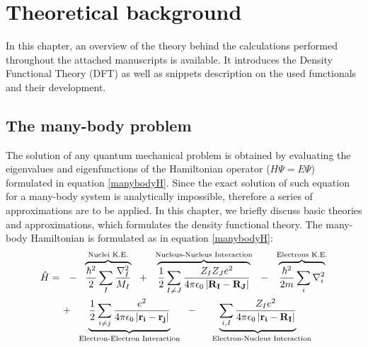 \chapter{Theoretical background}
\label{DFT-chapter}
In this chapter, an overview of the theory behind the calculations performed throughout the attached manuscripts is available. It introduces the Density Functional Theory (DFT) as well as snippets description on the used functionals and their development.
\section{The many-body problem}
The solution of any quantum mechanical problem is obtained by evaluating the eigenvalues and eigenfunctions of the Hamiltonian operator ($H\Psi=E\Psi$) formulated in equation \ref{manybodyH}. Since the exact solution of such equation for a many-body system is analytically impossible, therefore a series of approximations are to be applied. In this chapter, we briefly discuss basic theories and approximations, which formulates the density functional theory. The many-body Hamiltonian is formulated as in equation \ref{manybodyH}:
\begin{multline}
\hat{H}=\,\,\,\,-\,\,\,\,\overbrace{\frac{\hbar^2}{2}\sum_{I}{\frac{\nabla_I^2}{M_I}}}^\textrm{Nuclei K.E.}\,\,\,\,+\,\,\,\,\overbrace{{1 \over 2} \sum_{I \neq J}{\frac{Z_I Z_J e^2}{4\pi\epsilon_0\left| \mathbf{R_I}-\mathbf{R_J} \right|}}}^\textrm{Nucleus-Nucleus Interaction}\,\,\,\,-\,\,\,\,\overbrace{\frac{\hbar^2}{2m}\sum_{i}{\nabla_i^2}}^\textrm{Electrons K.E.}\\ \,\,\,\,+\,\,\,\,\underbrace{{1 \over 2} \sum_{i \neq j}{\frac{e^2}{4\pi\epsilon_0\left| \mathbf{r_i}-\mathbf{r_j} \right|}}}_\textrm{Electron-Electron Interaction}\,\,\,\,-\,\,\,\,\underbrace{ \sum_{i,  I}{\frac{Z_I {e^2}}{4\pi\epsilon_0\left| \mathbf{r_i}-\mathbf{R_I} \right|}}}_\textrm{\, \, Electron-Nucleus Interaction}
\label{manybodyH}
\end{multline}

